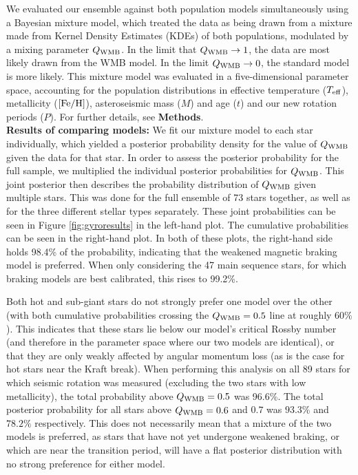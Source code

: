 \documentclass[12pt]{article}
\newcommand{\feh}{\mbox{$\rm{[Fe/H]}$}\xspace}
\newcommand{\rtwo}[1]{{#1}}
\begin{document}
We evaluated our ensemble against both population models simultaneously using a Bayesian mixture model, which treated the data as being drawn from a mixture made from Kernel Density Estimates (KDEs) of both populations, modulated by a mixing parameter $Q_{\rm WMB}$. In the limit that $Q_{\rm WMB} \rightarrow 1$, the data are most likely drawn from the WMB model. In the limit $Q_{\rm WMB} \rightarrow 0$, the standard model is more likely. This mixture model was evaluated in a five-dimensional parameter space, accounting for the population distributions in effective temperature ($T_{\rm eff}$), metallicity (\feh), asteroseismic mass ($M$) and age ($t$) and our new rotation periods ($P$). For further details, see \textbf{Methods}.\\

\textbf{Results of comparing models:} We fit our mixture model to each star individually, which yielded a posterior probability density for the value of $Q_{\rm WMB}$ given the data for that star. In order to assess the posterior probability for the full sample, we multiplied the individual posterior probabilities for $Q_{\rm{WMB}}$. \rtwo{This joint posterior then describes the probability distribution of $Q_{\rm WMB}$ given multiple stars.} This was done for the full ensemble of 73 stars together, as well as for the three different stellar types separately. These joint probabilities can be seen in Figure \ref{fig:gyroresults} in the left-hand plot. The cumulative probabilities can be seen in the right-hand plot. In both of these plots, the right-hand side holds 98.4\% of the probability, indicating that the weakened magnetic braking model is preferred. When only considering the 47 main sequence stars, for which braking models are best calibrated, this rises to 99.2\%. 

Both hot and sub-giant stars do not strongly prefer one model over the other (with both cumulative probabilities crossing the $Q_{\rm{WMB}} = 0.5$ line at roughly $60\%$). \rtwo{This indicates that these stars lie below our model's critical Rossby number (and therefore in the parameter space where our two models are identical), or that they are only weakly affected by angular momentum loss (as is the case for hot stars near the Kraft break).} When performing this analysis on all 89 stars for which seismic rotation was measured (excluding the two stars with low metallicity), the total probability above $Q_{\rm{WMB}} = 0.5$ was 96.6\%. \rtwo{The total posterior probability for all stars above $Q_{\rm{WMB}} = 0.6$ and $0.7$ was $93.3\%$ and $78.2\%$  respectively. This does not necessarily mean that a mixture of the two models is preferred, as stars that have not yet undergone weakened braking, or which are near the transition period, will have a flat posterior distribution with no strong preference for either model.}\\
\end{document}
